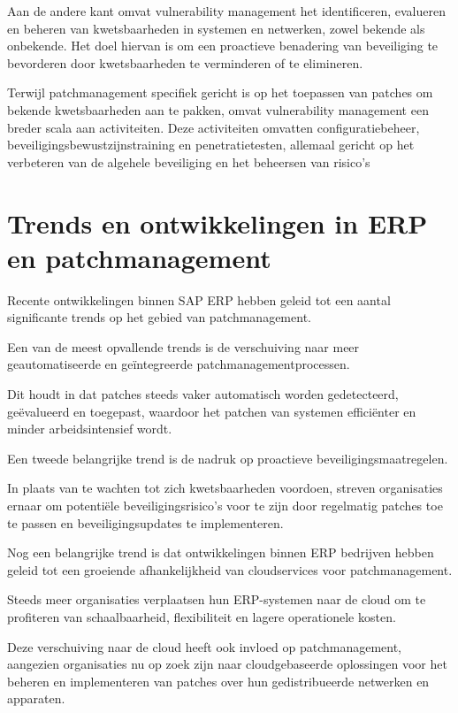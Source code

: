 Aan de andere kant omvat vulnerability management het identificeren, evalueren en beheren van kwetsbaarheden in systemen en netwerken, zowel bekende als onbekende. Het doel hiervan is om een proactieve benadering van beveiliging te bevorderen door kwetsbaarheden te verminderen of te elimineren. 

Terwijl patchmanagement specifiek gericht is op het toepassen van patches om bekende kwetsbaarheden aan te pakken, omvat vulnerability management een breder scala aan activiteiten. Deze activiteiten omvatten configuratiebeheer, beveiligingsbewustzijnstraining en penetratietesten, allemaal gericht op het verbeteren van de algehele beveiliging en het beheersen van risico’s \autocite{Danby2023}


\section{Trends en ontwikkelingen in  ERP en patchmanagement}
Recente ontwikkelingen binnen SAP ERP hebben geleid tot een aantal significante trends op het gebied van patchmanagement.

Een van de meest opvallende trends is de verschuiving naar meer geautomatiseerde en geïntegreerde patchmanagementprocessen.

Dit houdt in dat patches steeds vaker automatisch worden gedetecteerd, geëvalueerd en toegepast, waardoor het patchen van systemen efficiënter en minder arbeidsintensief wordt.

Een tweede belangrijke trend is de nadruk op proactieve beveiligingsmaatregelen.

In plaats van te wachten tot zich kwetsbaarheden voordoen, streven organisaties ernaar om potentiële beveiligingsrisico's voor te zijn door regelmatig patches toe te passen en beveiligingsupdates te implementeren.

Nog een belangrijke trend is dat ontwikkelingen binnen ERP bedrijven hebben geleid tot een groeiende afhankelijkheid van cloudservices voor patchmanagement.

Steeds meer organisaties verplaatsen hun ERP-systemen naar de cloud om te profiteren van schaalbaarheid, flexibiliteit en lagere operationele kosten.

Deze verschuiving naar de cloud heeft ook invloed op patchmanagement, aangezien organisaties nu op zoek zijn naar cloudgebaseerde oplossingen voor het beheren en implementeren van patches over hun gedistribueerde netwerken en apparaten. \autocite{Kannan2023}

